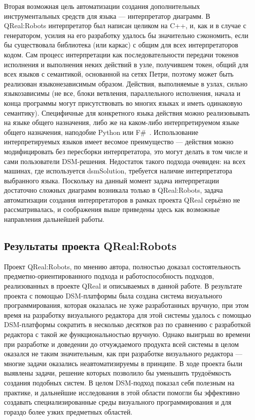 Вторая возможная цель автоматизации создания дополнительных инструментальных средств 
для языка --- интерпретатор диаграмм. В QReal:Robots интерпретатор был написан целиком 
на C++, и, как и в случае с генератором,  усилия на его разработку удалось бы значительно 
сэкономить, если бы существовала библиотека (или каркас) с общим для всех интерпретаторов 
кодом. Сам процесс интерпретации как последовательности передачи токенов исполнения и 
выполнения неких действий в узле, получившем токен, общий для всех языков с семантикой, 
основанной на сетях Петри, поэтому может быть реализован языконезависимым образом. 
Действия, выполняемые в узлах, сильно языкозависимы (не все, блоки ветвления, параллельного 
исполнения, начала и конца программы могут присутствовать во многих языках и иметь 
одинаковую семантику). Специфичные для конкретного языка действия можно реализовывать 
на языке общего назначения, либо же на каком-либо интерпретируемом языке общего назначения, 
наподобие Python
 или F\#~\cite{syme2012expert}. Использование интерпретируемых языков имеет весомое преимущество --- действия можно 
модифицировать без пересборки интерпретатора, это могут делать в том числе и сами 
пользователи \ac{DSM}-решения. Недостаток такого подхода очевиден: на всех машинах, где 
используется \ac{dsmSolution}, требуется наличие интерпретатора выбранного языка. Поскольку 
на данный момент задача интерпретации достаточно сложных диаграмм возникала только 
в QReal:Robots, задача автоматизации создания интерпретаторов в рамках проекта QReal 
серьёзно не рассматривалась, и соображения выше приведены здесь как возможные направления 
дальнейшей работы.

\subsection{Результаты проекта QReal:Robots}
Проект QReal:Robots, по мнению автора, полностью доказал состоятельность предметно-ориентированного 
подхода и работоспособность подходов, реализованных в проекте QReal и описываемых в 
данной работе. В результате проекта с помощью \ac{DSM}-платформы была создана система визуального 
программирования, которая оказалась не хуже разработанных вручную, при этом время 
на разработку визуального редактора для этой системы удалось с помощью \ac{DSM}-платформы 
сократить в несколько десятков раз по сравнению с разработкой редактора с такой же 
функциональностью вручную. Однако выигрыш во времени при разработке и доведении до 
отчуждаемого продукта всей системы в целом оказался не таким значительным, как при 
разработке визуального редактора --- многие задачи оказались неавтоматизируемы в принципе. 
В ходе проекта были выявлены задачи, решение которых позволило бы уменьшить трудоёмкость 
создания подобных систем. В целом \ac{DSM}-подход показал себя полезным на практике, и 
дальнейшие исследования в этой области помогли бы эффективно создавать специализированные 
среды визуального программирования и для гораздо более узких предметных областей.

